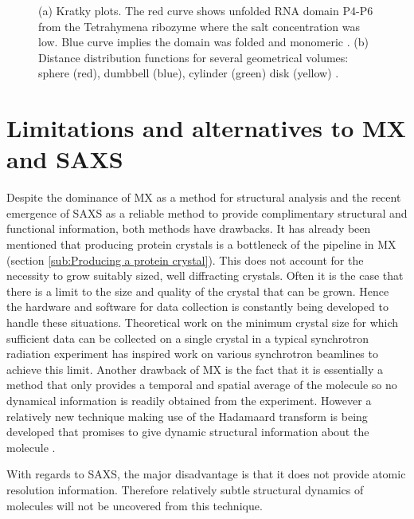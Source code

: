 \begin{figure}
\begin{subfigure}[b]{0.4\textwidth}
                \caption{}
                \label{fig:Distance distribution plot}
        \end{subfigure}
        \caption{(a) Kratky plots. The red curve shows unfolded RNA domain P4-P6 from the Tetrahymena ribozyme where the salt concentration was low. Blue curve implies the domain was folded and monomeric \cite{pollack2011saxs}. (b) Distance distribution functions for several geometrical volumes: sphere (red),  dumbbell (blue), cylinder (green) disk (yellow) \cite{blanchet2013small}.}
        \label{fig:SAXS structural analysis graphs}
    \end{figure}

\section{Limitations and alternatives to MX and SAXS}
\label{sec:Limitations and alternatives to MX and SAXS}
    Despite the dominance of MX as a method for structural analysis and the recent emergence of SAXS as a reliable method to provide complimentary structural and functional information, both methods have drawbacks.
    It has already been mentioned that producing protein crystals is a bottleneck of the pipeline in MX (section \ref{sub:Producing a protein crystal}).
    This does not account for the necessity to grow suitably sized, well diffracting crystals. Often it is the case that there is a limit to the size and quality of the crystal that can be grown.
    Hence the hardware and software for data collection is constantly being developed to handle these situations.
    Theoretical work on the minimum crystal size for which sufficient data can be collected on a single crystal in a typical synchrotron radiation experiment \cite{holton2010} has inspired work on various synchrotron beamlines to achieve this limit.
    Another drawback of MX is the fact that it is essentially a method that only provides a temporal and spatial average of the molecule so no dynamical information is readily obtained from the experiment.
    However a relatively new technique making use of the Hadamaard transform is being developed that promises to give dynamic structural information about the molecule \cite{yorke2014time}.

    With regards to SAXS, the major disadvantage is that it does not provide atomic resolution information. Therefore relatively subtle structural dynamics of molecules will not be uncovered from this technique.

